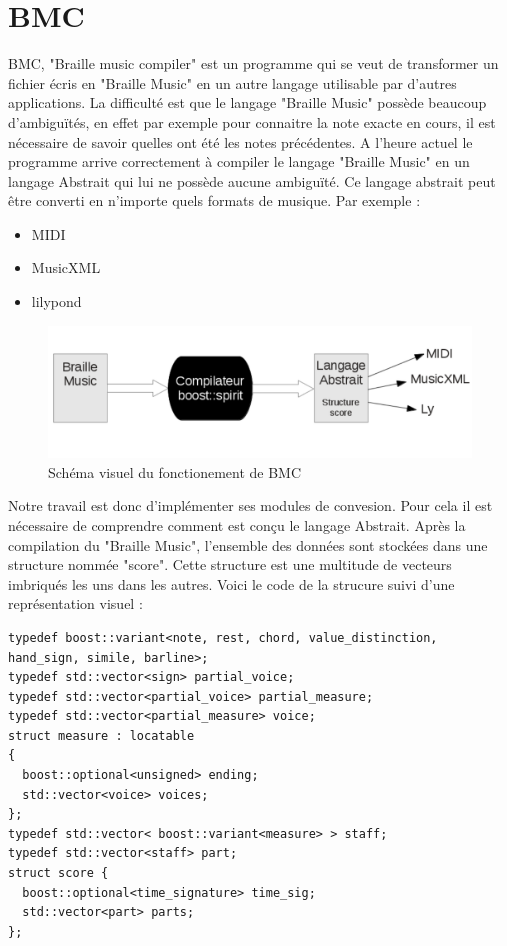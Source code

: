 \section{BMC}

BMC, "Braille music compiler" est un programme qui se veut de transformer un fichier écris en "Braille Music" en un autre langage utilisable par d'autres applications. La difficulté est que le langage "Braille Music" possède beaucoup d'ambiguïtés, en effet par exemple pour connaitre la note exacte en cours, il est nécessaire de savoir quelles ont été les notes précédentes. A l'heure actuel le programme arrive correctement à compiler le langage "Braille Music" en un langage Abstrait qui lui ne possède aucune ambiguïté. Ce langage abstrait peut être converti en n'importe quels formats de musique. Par exemple : 
\begin{itemize}
\item MIDI
\item MusicXML
\item lilypond
\end{itemize}
\begin{figure}[!h]
  \centering
  \includegraphics[scale=0.4]{images/fonction-bmc.png}
  \caption{Schéma visuel du fonctionement de BMC}
  
\end{figure}

Notre travail est donc d'implémenter ses modules de convesion. Pour cela il est nécessaire de comprendre comment est conçu le langage Abstrait. Après la compilation du "Braille Music", l'ensemble des données sont stockées dans une structure nommée "score". Cette structure est une multitude de vecteurs imbriqués les uns dans les autres. Voici le code de la strucure suivi d'une représentation visuel :

\begin{verbatim}
typedef boost::variant<note, rest, chord, value_distinction, hand_sign, simile, barline>;
typedef std::vector<sign> partial_voice;
typedef std::vector<partial_voice> partial_measure;
typedef std::vector<partial_measure> voice;
struct measure : locatable
{
  boost::optional<unsigned> ending;
  std::vector<voice> voices;
};
typedef std::vector< boost::variant<measure> > staff;
typedef std::vector<staff> part;
struct score {
  boost::optional<time_signature> time_sig;
  std::vector<part> parts;
};
\end{verbatim}

